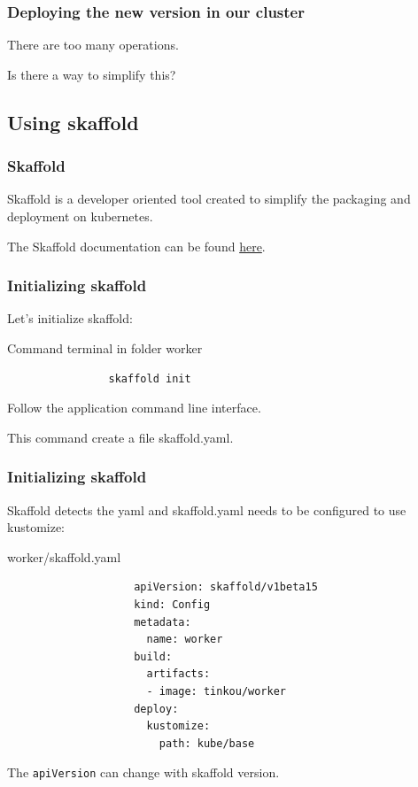 	\begin{frame}
		\frametitle{Deploying the new version in our cluster}
		
		There are too many operations.
		
		\bigskip
		Is there a way to simplify this?
	\end{frame}
	
\subsection{Using skaffold}	
	
	\begin{frame}
		\frametitle{Skaffold}
		
		Skaffold is a developer oriented tool created to simplify the packaging and deployment on kubernetes.
		
		\medskip
		The Skaffold documentation can be found \href{https://github.com/GoogleContainerTools/skaffold}{here}.

	\end{frame}
	
	\begin{frame}[fragile]
		\frametitle{Initializing skaffold}
		
		Let's initialize skaffold:
		\begin{block}{Command terminal in folder worker}
			\begin{verbatim}
				skaffold init
			\end{verbatim}
			Follow the application command line interface.
		\end{block}
		\medskip
		This command create a file skaffold.yaml.
	\end{frame}
	
	\begin{frame}[fragile]
		\frametitle{Initializing skaffold}

		Skaffold detects the yaml and skaffold.yaml needs to be configured to use kustomize:
		\begin{block}{worker/skaffold.yaml}
			\begin{footnotesize}
				\begin{verbatim}
					apiVersion: skaffold/v1beta15
					kind: Config
					metadata:
					  name: worker
					build:
					  artifacts:
					  - image: tinkou/worker
					deploy:
					  kustomize:
					    path: kube/base
				\end{verbatim}						
			\end{footnotesize}
		\end{block}
		The \verb!apiVersion! can change with skaffold version.
	\end{frame}
	

